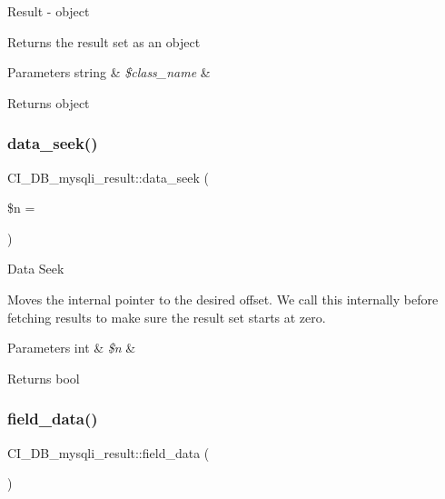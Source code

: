 Result -\/ object

Returns the result set as an object


\begin{DoxyParams}[1]{Parameters}
string & {\em \$class\+\_\+name} & \\
\hline
\end{DoxyParams}
\begin{DoxyReturn}{Returns}
object 
\end{DoxyReturn}
\mbox{\label{class_c_i___d_b__mysqli__result_a79861c00259afb295749f928f9761456}} 
\subsubsection{\texorpdfstring{data\+\_\+seek()}{data\_seek()}}
{\footnotesize\ttfamily C\+I\+\_\+\+D\+B\+\_\+mysqli\+\_\+result\+::data\+\_\+seek (\begin{DoxyParamCaption}\item[{}]{\$n = {} }\end{DoxyParamCaption})}

Data Seek

Moves the internal pointer to the desired offset. We call this internally before fetching results to make sure the result set starts at zero.


\begin{DoxyParams}[1]{Parameters}
int & {\em \$n} & \\
\hline
\end{DoxyParams}
\begin{DoxyReturn}{Returns}
bool 
\end{DoxyReturn}
\mbox{\label{class_c_i___d_b__mysqli__result_ae1b37bfa4507588d6ca5656b684e5d6a}} 
\subsubsection{\texorpdfstring{field\+\_\+data()}{field\_data()}}
{\footnotesize\ttfamily C\+I\+\_\+\+D\+B\+\_\+mysqli\+\_\+result\+::field\+\_\+data (\begin{DoxyParamCaption}{ }\end{DoxyParamCaption})}

